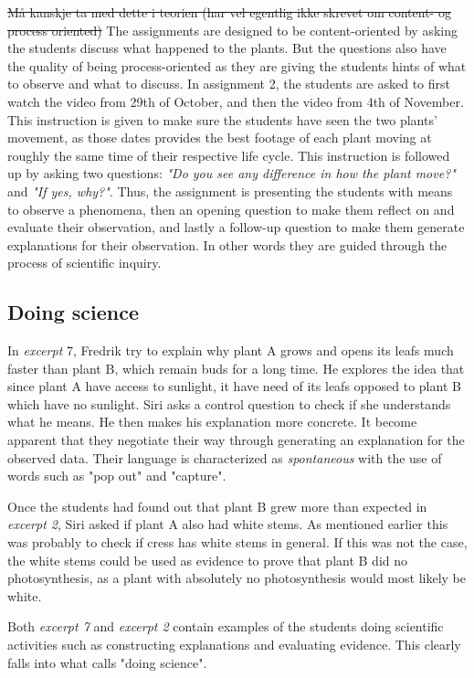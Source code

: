 \sout{Må kanskje ta med dette i teorien (har vel egentlig ikke skrevet om content- og process oriented)}
The assignments are designed to be content-oriented by asking the students discuss what happened to the plants. But the questions also have the quality of being process-oriented as they are giving the students hints of what to observe and what to discuss. In assignment 2, the students are asked to first watch the video from 29th of October, and then the video from 4th of November. This instruction is given to make sure the students have seen the two plants' movement, as those dates provides the best footage of each plant moving at roughly the same time of their respective life cycle. This instruction is followed up by asking two questions: \emph{"Do you see any difference in how the plant move?"} and \emph{"If yes, why?"}. Thus, the assignment is presenting the students with means to observe a phenomena, then an opening question to make them reflect on and evaluate their observation, and lastly a follow-up question to make them generate explanations for their observation. In other words they are guided through the process of scientific inquiry.

\subsection{Doing science}
In \emph{excerpt} 7, Fredrik try to explain why plant A grows and opens its leafs much faster than plant B, which remain buds for a long time. He explores the idea that since plant A have access to sunlight, it have need of its leafs opposed to plant B which have no sunlight. Siri asks a control question to check if she understands what he means. He then makes his explanation more concrete. It become apparent that they negotiate their way through generating an explanation for the observed data. Their language is characterized as \emph{spontaneous} with the use of words such as "pop out" and "capture". 

Once the students had found out that plant B grew more than expected in \emph{excerpt 2}, Siri asked if plant A also had white stems. As mentioned earlier this was probably to check if cress has white stems in general. If this was not the case, the white stems could be used as evidence to prove that plant B did no photosynthesis, as a plant with absolutely no photosynthesis would most likely be white. 

Both \emph{excerpt 7} and \emph{excerpt 2} contain examples of the students doing scientific activities such as constructing explanations and evaluating evidence. This clearly falls into what \citet{jimenez2000doing} calls "doing science".

